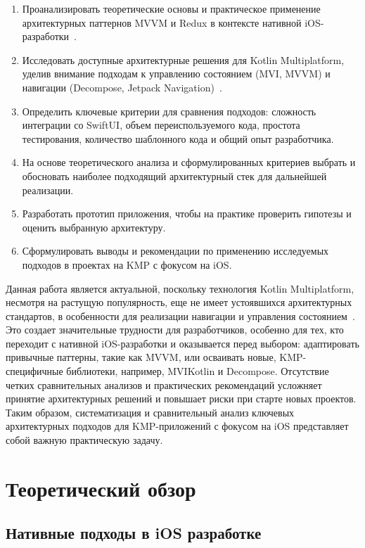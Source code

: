 \documentclass[14pt, russian]{scrartcl}
\begin{document}
\begin{enumerate}
    \item Проанализировать теоретические основы и практическое применение архитектурных паттернов MVVM и Redux в контексте нативной iOS-разработки~\cite{ios-dev}.
    \item Исследовать доступные архитектурные решения для Kotlin Multiplatform, уделив внимание подходам к управлению состоянием (MVI, MVVM) и навигации (Decompose, Jetpack Navigation)~\cite{kmp-decompose-mvi}.
    \item Определить ключевые критерии для сравнения подходов: сложность интеграции со SwiftUI, объем переиспользуемого кода, простота тестирования, количество шаблонного кода и общий опыт разработчика.
    \item На основе теоретического анализа и сформулированных критериев выбрать и обосновать наиболее подходящий архитектурный стек для дальнейшей реализации.
    \item Разработать прототип приложения, чтобы на практике проверить гипотезы и оценить выбранную архитектуру.
    \item Сформулировать выводы и рекомендации по применению исследуемых подходов в проектах на KMP с фокусом на iOS.
\end{enumerate}

Данная работа является актуальной, поскольку технология Kotlin Multiplatform, несмотря на растущую популярность, еще не имеет устоявшихся архитектурных стандартов, в особенности для реализации навигации и управления состоянием~\cite{mvikotlin-practice}. Это создает значительные трудности для разработчиков, особенно для тех, кто переходит с нативной iOS-разработки и оказывается перед выбором: адаптировать привычные паттерны, такие как MVVM, или осваивать новые, KMP-специфичные библиотеки, например, MVIKotlin и Decompose. Отсутствие четких сравнительных анализов и практических рекомендаций усложняет принятие архитектурных решений и повышает риски при старте новых проектов. Таким образом, систематизация и сравнительный анализ ключевых архитектурных подходов для KMP-приложений с фокусом на iOS представляет собой важную практическую задачу.


\section{Теоретический обзор}

\subsection{Нативные подходы в iOS разработке}
\end{document}
